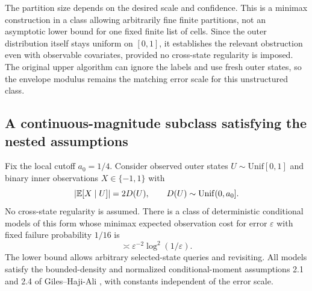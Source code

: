 The partition size depends on the desired scale and confidence. This is
a minimax construction in a class allowing arbitrarily fine finite
partitions, not an asymptotic lower bound for one fixed finite list of
cells. Since the outer distribution itself stays uniform on $[0,1]$, it
establishes the relevant obstruction even with observable covariates,
provided no cross-state regularity is imposed. The original upper
algorithm can ignore the labels and use fresh outer states, so the
envelope modulus remains the matching error scale for this
unstructured class.

\subsection{A continuous-magnitude subclass satisfying the nested assumptions}
\begin{proposition}\label{prop:continuous}
Fix the local cutoff $a_0=1/4$. Consider observed outer states $U\sim\mathrm{Unif}[0,1]$ and binary inner observations $X\in\{-1,1\}$ with
\[
|\mathbb E[X\mid U]|=2D(U),\qquad D(U)\sim\mathrm{Unif}(0,a_0].
\]
No cross-state regularity is assumed. There is a class of deterministic conditional models of this form whose minimax expected observation cost for error $\varepsilon$ with fixed failure probability $1/16$ is
\[
\asymp\varepsilon^{-2}\log^2(1/\varepsilon).
\]
The lower bound allows arbitrary selected-state queries and revisiting. All models satisfy the bounded-density and normalized conditional-moment assumptions 2.1 and 2.4 of Giles--Haji-Ali \cite{gileshajiali}, with constants independent of the error scale.
\end{proposition}
